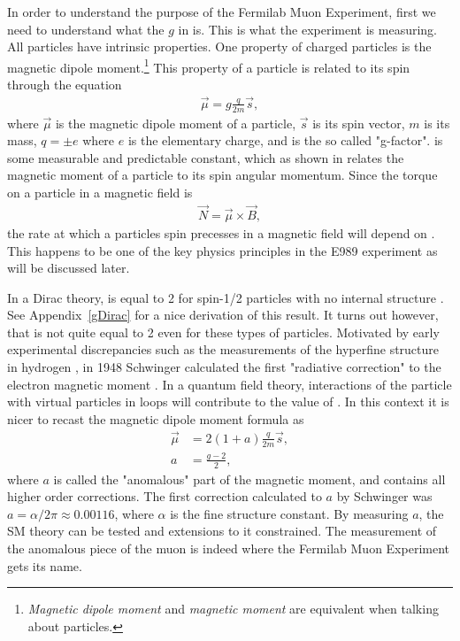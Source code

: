 In order to understand the purpose of the Fermilab Muon \gmtwo Experiment, first we need to understand what the $g$ in \gmtwo is. This is what the experiment is measuring. All particles have intrinsic properties. One property of charged particles is the magnetic dipole moment.\footnote{\textit{Magnetic dipole moment} and \textit{magnetic moment} are equivalent when talking about particles.} This property of a particle is related to its spin through the equation
		\begin{align}
            \vec{\mu} = g \frac{q}{2m} \vec{s},
        \label{eq:magneticmoment}
		\end{align}
where $\vec{\mu}$ is the magnetic dipole moment of a particle, $\vec{s}$ is its spin vector, $m$ is its mass, $q = \pm e$ where $e$ is the elementary charge, and \g is the so called "g-factor". \g is some measurable and predictable constant, which as shown in  relates the magnetic moment of a particle to its spin angular momentum. Since the torque on a particle in a magnetic field is 
		\begin{align}
            \vec{N} = \vec{\mu} \times \vec{B},
        \label{eq:torque}
		\end{align}
the rate at which a particles spin precesses in a magnetic field will depend on \g. This happens to be one of the key physics principles in the E989 experiment as will be discussed later.

In a Dirac theory, \g is equal to 2 for spin-1/2 particles with no internal structure \cite{Dirac}. See Appendix~\ref{gDirac} for a nice derivation of this result. It turns out however, that \g is not quite equal to 2 even for these types of particles. Motivated by early experimental discrepancies such as the measurements of the hyperfine structure in hydrogen \cite{EarlyHyperfine1}, in 1948 Schwinger calculated the first "radiative correction" to the electron magnetic moment \cite{Schwinger}. In a quantum field theory, interactions of the particle with virtual particles in loops will contribute to the value of \g. In this context it is nicer to recast the magnetic dipole moment formula as 
		\begin{equation}
		\begin{aligned}
            \vec{\mu} &= 2(1+a) \frac{q}{2m} \vec{s}, \\
            a &= \frac{g-2}{2},
        \label{eq:anamoly}
		\end{aligned}
		\end{equation}
where $a$ is called the "anomalous" part of the magnetic moment, and contains all higher order corrections. The first correction calculated to $a$ by Schwinger was $a = \alpha/2\pi \approx 0.00116$, where $\alpha$ is the fine structure constant. By measuring $a$, the SM theory can be tested and extensions to it constrained. The measurement of the anomalous piece of the muon is indeed where the Fermilab Muon \gmtwo Experiment gets its name.



